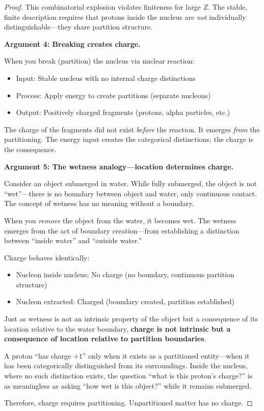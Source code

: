\documentclass[twocolumn,10pt,a4paper]{article}
\theoremstyle{definition}
\theoremstyle{remark}
\begin{document}
\begin{proof}
This combinatorial explosion violates finiteness for large $Z$. The stable, finite description requires that protons inside the nucleus are \emph{not} individually distinguishable---they share partition structure.

\textbf{Argument 4: Breaking creates charge.}

When you break (partition) the nucleus via nuclear reaction:
\begin{itemize}
    \item Input: Stable nucleus with no internal charge distinctions
    \item Process: Apply energy to create partitions (separate nucleons)
    \item Output: Positively charged fragments (protons, alpha particles, etc.)
\end{itemize}

The charge of the fragments did not exist \emph{before} the reaction. It emerges \emph{from} the partitioning. The energy input creates the categorical distinctions; the charge is the consequence.

\textbf{Argument 5: The wetness analogy---location determines charge.}

Consider an object submerged in water. While fully submerged, the object is not ``wet''---there is no boundary between object and water, only continuous contact. The concept of wetness has no meaning without a boundary.

When you \emph{remove} the object from the water, it becomes wet. The wetness emerges from the act of boundary creation---from establishing a distinction between ``inside water'' and ``outside water.''

Charge behaves identically:
\begin{itemize}
    \item Nucleon inside nucleus: No charge (no boundary, continuous partition structure)
    \item Nucleon extracted: Charged (boundary created, partition established)
\end{itemize}

Just as wetness is not an intrinsic property of the object but a consequence of its location relative to the water boundary, \textbf{charge is not intrinsic but a consequence of location relative to partition boundaries}.

A proton ``has charge $+1$'' only when it exists as a partitioned entity---when it has been categorically distinguished from its surroundings. Inside the nucleus, where no such distinction exists, the question ``what is this proton's charge?'' is as meaningless as asking ``how wet is this object?'' while it remains submerged.

Therefore, charge requires partitioning. Unpartitioned matter has no charge.
\end{proof}
\end{document}
